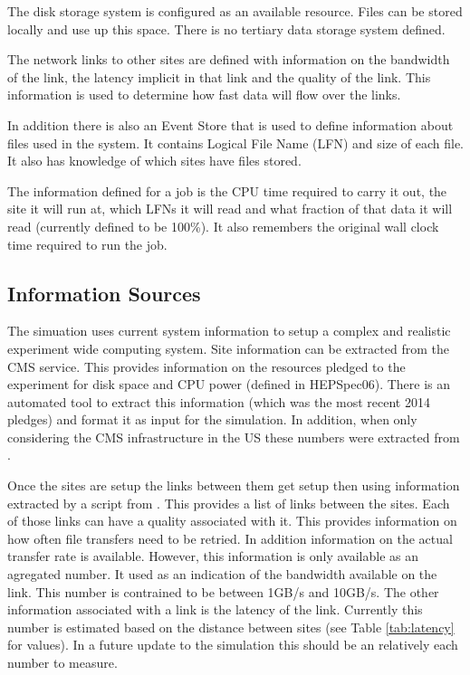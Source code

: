 \documentclass[a4paper]{jpconf}
\begin{document}
The disk storage system is configured as an available resource. Files
can be stored locally and use up this space. There is no tertiary data
storage system defined.

The network links to other sites are defined with information on the
bandwidth of the link, the latency implicit in that link and the quality
of the link. This information is used to determine how fast data will
flow over the links.

In addition there is also an Event Store that is used to define
information about files used in the system. It contains Logical File
Name (LFN) and size of each file. It also has knowledge of which sites
have files stored.

The information defined for a job is the CPU time required to carry it
out, the site it will run at, which LFNs it will read and what
fraction of that data it will read (currently defined to be 100\%). It
also remembers the original wall clock time required to run the job.

\subsection{Information Sources}

The simuation uses current system information to setup a complex and
realistic experiment wide computing system. Site information can be
extracted from the CMS
service. This provides information on the resources pledged to the
experiment for disk space and CPU power (defined in HEPSpec06). There
is an automated tool to extract this information (which was the most
recent 2014 pledges) and format it as input for the simulation. In
addition, when only considering the CMS infrastructure in the US these
numbers were extracted from
.

Once the sites are setup the links between them get setup then using
information extracted by a script from
. This
provides a list of links between the sites. Each of those links can
have a quality associated with it. This provides information on how
often file transfers need to be retried. In addition information on
the actual transfer rate is available. However, this information is
only available as an agregated number. It used as an indication of the
bandwidth available on the link. This number is contrained to be
between 1GB/s and 10GB/s. The other information associated with a link
is the latency of the link. Currently this number is estimated based
on the distance between sites (see Table \ref{tab:latency} for
values). In a future update to the simulation this should be an
relatively each number to measure.
\end{document}
